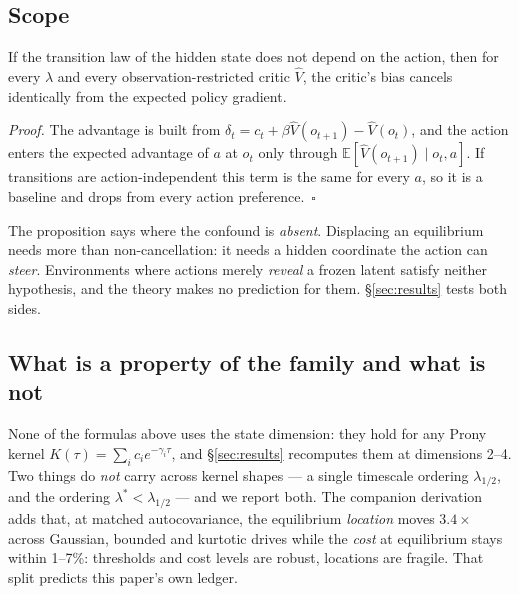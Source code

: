 \subsection{Scope}

\begin{proposition}[Scope]
If the transition law of the hidden state does not depend on the action, then
for every $\lambda$ and every observation-restricted critic $\hat V$, the
critic's bias cancels identically from the expected policy gradient.
\end{proposition}
\emph{Proof.} The advantage is built from
$\delta_t = c_t + \beta\hat V(o_{t+1}) - \hat V(o_t)$, and the action enters
the expected advantage of $a$ at $o_t$ only through
$\mathbb{E}[\hat V(o_{t+1})\mid o_t, a]$. If transitions are
action-independent this term is the same for every $a$, so it is a baseline
and drops from every action preference.~$\square$

The proposition says where the confound is \emph{absent}. Displacing an
equilibrium needs more than non-cancellation: it needs a hidden coordinate the
action can \emph{steer}. Environments where actions merely \emph{reveal} a
frozen latent satisfy neither hypothesis, and the theory makes no prediction
for them. \S\ref{sec:results} tests both sides.

\subsection{What is a property of the family and what is not}

None of the formulas above uses the state dimension: they hold for any Prony
kernel $K(\tau)=\sum_i c_i e^{-\gamma_i\tau}$, and \S\ref{sec:results}
recomputes them at dimensions 2--4. Two things do \emph{not} carry across
kernel shapes --- a single timescale ordering $\lambda_{1/2}$, and the ordering
$\lambda^\ast<\lambda_{1/2}$ --- and we report both. The companion derivation
adds that, at matched autocovariance, the equilibrium \emph{location} moves
$3.4\times$ across Gaussian, bounded and kurtotic drives while the \emph{cost}
at equilibrium stays within 1--7\%: thresholds and cost levels are robust,
locations are fragile. That split predicts this paper's own ledger.
